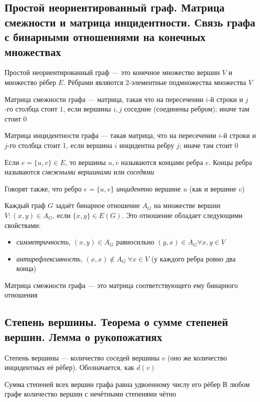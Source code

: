 \documentclass[a4paper]{article}
\begin{document}
\subsection{Простой неориентированный граф. Матрица смежности и матрица инцидентности. Связь графа с бинарными отношениями на конечных множествах}
 Простой неориентированный граф — это конечное множество вершин $V$ и множество рёбер $E$. Рёбрами являются 2-элементные подмножества множества $V$

 Матрица смежности графа — матрица, такая что на пересечении $i$-й строки и $j$-го столбца стоит $1$, если вершины $i, j$ соседние (соединены ребром); иначе там стоит 0

 Матрица инцидентности графа — такая матрица, что на пересечении $i$-й строки и $j$-го столбца стоит 1, если вершина $i$ инцидентна ребру $j$; иначе там стоит 0

Если $e=\{u, v\} \in E$, то вершины $u, v$ называются концами ребра $e$. Концы ребра называются \textit{смежными вершинами} или \textit{соседями}

Говорят также, что ребро $e=\{u, v\}$ \textit{инцидентно} вершине $u$ (как и вершине $v$)

\comment Каждый граф $G$ задаёт бинарное отношение $A_G$ на множестве вершин $V:(x, y) \in A_G$, если $\{x, y\} \in E(G)$. Это отношение обладает следующими свойствами:
\begin{itemize}
    \item \textit{симметричность}, $(x,y) \in A_G$ равносильно $(y,x) \in A_G \forall x,y \in V$
    \item \textit{антирефлексивность}, $(x, x) \notin A_G\ \forall x \in V$ (у каждого ребра ровно два конца)
\end{itemize}

 Матрица смежности графа — это матрица соответствующего ему бинарного отношения

\subsection{Степень вершины. Теорема о сумме степеней вершин. Лемма о рукопожатиях}
\label{sec:1.65} Степень вершины — количество соседей вершины $v$ (оно же количество инцидентных её рёбер). Обозначается, как $d(v)$

\theorem Сумма степеней всех вершин графа равна удвоенному числу его рёбер
\lemma В любом графе количество вершин с нечётными степенями чётно
\end{document}
